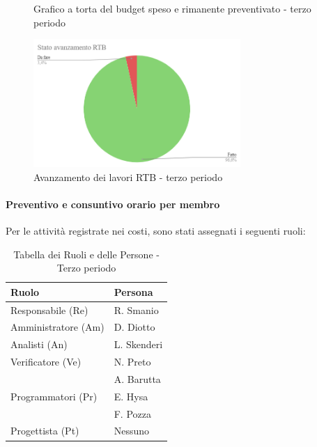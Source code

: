 \begin{figure}[H]
    \centering
    \begin{minipage}[b]{0.45\textwidth}
        \centering
        \caption{Grafico a torta del budget speso e rimanente preventivato - terzo periodo}
        \label{fig:Budget_speso_3}
    \end{minipage}
    
    \vspace{1cm}

    \begin{minipage}[b]{0.70\textwidth}
        \centering
        \includegraphics[width=0.7\textwidth]{../Images/avanzamento3Periodo.png}
        \caption{Avanzamento dei lavori RTB - terzo periodo}
        \label{fig:Avanzamento_RTB_3}
    \end{minipage}
\end{figure}

\paragraph{Preventivo e consuntivo orario per membro} \hspace{1pt}
Per le attività registrate nei costi, sono stati assegnati i seguenti ruoli:  

\begin{table}[H]
    \centering
    \begin{tabular}{|l|l|}
    \hline
    \textbf{Ruolo} & \textbf{Persona} \\
    \hline
    \hline
    Responsabile (Re) & R. Smanio \\
    \hline
    Amministratore (Am) & D. Diotto \\
    \hline
    Analisti (An) & L. Skenderi \\
    \hline
    Verificatore (Ve) & N. Preto \\
     & A. Barutta \\
     \hline
    Programmatori (Pr) & E. Hysa \\
     & F. Pozza \\
     \hline
    Progettista (Pt) & Nessuno \\
    \hline
    \end{tabular}
    \caption{Tabella dei Ruoli e delle Persone - Terzo periodo}
    \label{tab:Ruoli_persone_3}
    \end{table}
    

